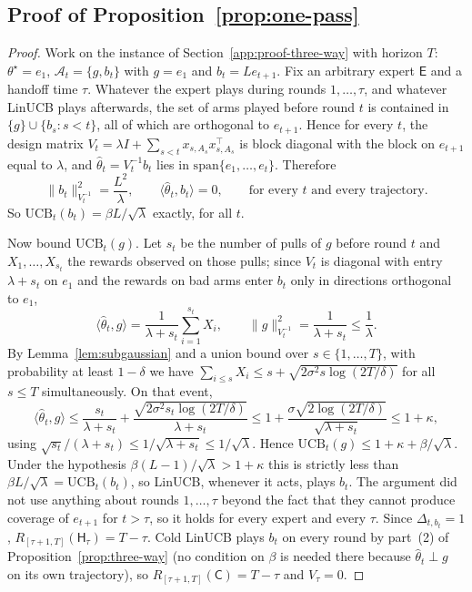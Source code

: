 \documentclass{article}
\theoremstyle{definition}
\theoremstyle{remark}
\theoremstyle{remark}
\newcommand{\Cold}{\mathsf{C}}
\newcommand{\Exp}{\mathsf{E}}
\newcommand{\Hyb}{\mathsf{H}}
\begin{document}
\subsection{Proof of Proposition~\ref{prop:one-pass}}
\label{app:proof-one-pass}

\begin{proof}
Work on the instance of Section~\ref{app:proof-three-way} with horizon $T$:
$\theta^\star=e_1$, $\mathcal A_t=\{g,b_t\}$ with $g=e_1$ and
$b_t=Le_{t+1}$. Fix an arbitrary expert $\Exp$ and a handoff time $\tau$.
Whatever the expert plays during rounds $1,\dots,\tau$, and whatever LinUCB
plays afterwards, the set of arms played before round $t$ is contained in
$\{g\}\cup\{b_s:s<t\}$, all of which are orthogonal to $e_{t+1}$. Hence for
every $t$, the design matrix $V_t=\lambda I+\sum_{s<t}x_{s,A_s}x_{s,A_s}^\top$
is block diagonal with the block on $e_{t+1}$ equal to $\lambda$, and
$\widehat\theta_t=V_t^{-1}b_t$ lies in $\mathrm{span}\{e_1,\dots,e_t\}$. Therefore
\[
\|b_t\|_{V_t^{-1}}^2=\frac{L^2}{\lambda},\qquad \langle\widehat\theta_t,b_t\rangle=0,
\qquad\text{for every }t\text{ and every trajectory.}
\]
So $\mathrm{UCB}_t(b_t)=\beta L/\sqrt\lambda$ exactly, for all $t$.

Now bound $\mathrm{UCB}_t(g)$. Let $s_t$ be the number of pulls of $g$ before
round $t$ and $X_1,\dots,X_{s_t}$ the rewards observed on those pulls; since
$V_t$ is diagonal with entry $\lambda+s_t$ on $e_1$ and the rewards on bad
arms enter $b_t$ only in directions orthogonal to $e_1$,
\[
\langle\widehat\theta_t,g\rangle=\frac{1}{\lambda+s_t}\sum_{i=1}^{s_t}X_i,
\qquad
\|g\|_{V_t^{-1}}^2=\frac{1}{\lambda+s_t}\le\frac1\lambda .
\]
By Lemma~\ref{lem:subgaussian} and a union bound over $s\in\{1,\dots,T\}$,
with probability at least $1-\delta$ we have
$\sum_{i\le s}X_i\le s+\sqrt{2\sigma^2s\log(2T/\delta)}$ for all $s\le T$
simultaneously. On that event,
\[
\langle\widehat\theta_t,g\rangle
\le\frac{s_t}{\lambda+s_t}+\frac{\sqrt{2\sigma^2s_t\log(2T/\delta)}}{\lambda+s_t}
\le 1+\frac{\sigma\sqrt{2\log(2T/\delta)}}{\sqrt{\lambda+s_t}}
\le 1+\kappa ,
\]
using $\sqrt{s_t}/(\lambda+s_t)\le1/\sqrt{\lambda+s_t}\le1/\sqrt\lambda$.
Hence $\mathrm{UCB}_t(g)\le1+\kappa+\beta/\sqrt\lambda$. Under the hypothesis
$\beta(L-1)/\sqrt\lambda>1+\kappa$ this is strictly less than
$\beta L/\sqrt\lambda=\mathrm{UCB}_t(b_t)$, so LinUCB, whenever it acts, plays
$b_t$. The argument did not use anything about rounds $1,\dots,\tau$ beyond
the fact that they cannot produce coverage of $e_{t+1}$ for $t>\tau$, so it
holds for every expert and every $\tau$. Since $\Delta_{t,b_t}=1$,
$R_{[\tau+1,T]}(\Hyb_\tau)=T-\tau$. Cold LinUCB plays $b_t$ on every round by
part~(2) of Proposition~\ref{prop:three-way} (no condition on $\beta$ is
needed there because $\widehat\theta_t\perp g$ on its own trajectory), so
$R_{[\tau+1,T]}(\Cold)=T-\tau$ and $V_\tau=0$.
\end{proof}
\end{document}
